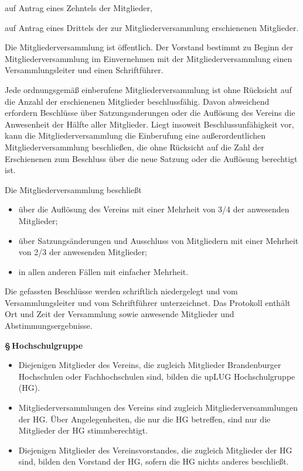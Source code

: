 \documentclass[11pt]{article}
\def\items#1{{%
  \itcounter0%
  \begin{itemize}
  #1
  \end{itemize}
}}
\let\it\item%
\def\item{
  \advance\itcounter1%
  \it[(\the\itcounter)]
}
\def\paragraf#1{
  \advance\itcounter1%
  \par\medskip
  {\large\bfseries \S\,\the\itcounter\quad#1}
  \par\smallskip
}
\begin{document}
{{        \item auf Antrag eines Zehntels der Mitglieder,
        \item auf Antrag eines Drittels der zur Mitgliederversammlung erschienenen Mitglieder.
       }
   \item
       Die Mitgliederversammlung ist {\"o}ffentlich. Der Vorstand bestimmt zu Beginn der Mitglieder\-ver\-sammlung
       im Einvernehmen mit der Mitgliederversammlung einen Versammlungsleiter und einen Schriftf{\"u}hrer.
   \item 
         Jede ordnungsgem{\"a}{\ss} einberufene Mitgliederversammlung ist ohne R{\"u}cksicht auf
         die Anzahl der erschienenen Mitglieder beschlussf{\"a}hig.
         Davon abweichend erfordern Beschl{\"u}sse {\"u}ber Satzungsnderungen oder
         die Aufl{\"o}sung des Vereins die
         Anwesenheit der H{\"a}lfte aller Mitglieder. Liegt insoweit Beschlussunf{\"a}higkeit
         vor, kann die Mitgliederversammlung die Einberufung eine au{\ss}erordentlichen
         Mitgliederversammlung beschlie{\ss}en, die ohne R{\"u}cksicht auf die Zahl der Erschienenen zum
         Beschluss {\"u}ber die neue Satzung oder die Aufl{\"o}sung berechtigt ist.
   \item
     Die Mitgliederversammlung beschlie{\ss}t
     \items{
       \item {\"u}ber die Aufl{\"o}sung des Vereins mit  einer Mehrheit von 3/4 der anwesenden Mitglieder;
       \item {\"u}ber Satzungs{\"a}nderungen und Ausschluss von Mitgliedern mit einer Mehrheit von
                2/3 der anwesenden Mitglieder;
       \item in allen anderen F{\"a}llen mit einfacher Mehrheit.
     }
   \item Die gefassten Beschl{\"u}sse werden schriftlich niedergelegt und vom
        Versammlungsleiter und vom Schriftf{\"u}hrer unterzeichnet. Das Protokoll enth{\"a}lt
        Ort und Zeit der Versammlung sowie anwesende Mitglieder und Abstimmungsergebnisse.
}



\paragraf{Hochschulgruppe}

\items{
  \item
    Diejenigen Mitglieder des Vereins, die zugleich Mitglieder Brandenburger Hochschulen oder
    Fachhochschulen sind, bilden die \glqq upLUG Hochschulgruppe\grqq{} (HG).
  \item
    Mitgliederversammlungen des Vereins sind zugleich Mitgliederversammlungen der HG.
    {\"U}ber Angelegenheiten, die nur die HG betreffen, sind nur die Mitglieder der HG
    stimmberechtigt.
  \item
    Diejenigen Mitglieder des Vereinsvorstandes, die zugleich
    Mitglieder der HG sind, bilden den Vorstand der HG, sofern die HG nichts anderes beschlie{\ss}t.
}
\end{document}
